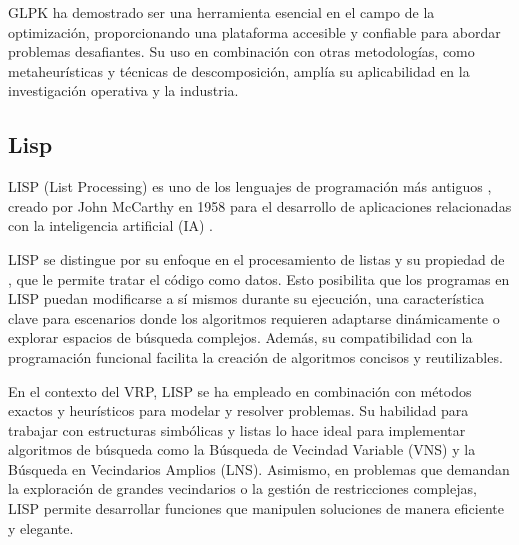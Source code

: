 \documentclass[12pt]{article}
\begin{document}
GLPK ha demostrado ser una herramienta esencial en el campo de la optimización, proporcionando una plataforma accesible y confiable para abordar problemas desafiantes. Su uso en combinación con otras metodologías, como metaheurísticas y técnicas de descomposición, amplía su aplicabilidad en la investigación operativa y la industria.


\subsection{Lisp}
LISP (List Processing) es uno de los lenguajes de programación más antiguos \agregaesto{[REF]}, creado por John McCarthy en 1958 para el desarrollo de aplicaciones relacionadas con la inteligencia artificial (IA) \agregaesto{[REF]}. 

LISP se distingue por su enfoque en el procesamiento de listas y su propiedad de , que le permite tratar el código como datos. Esto posibilita que los programas en LISP puedan modificarse a sí mismos durante su ejecución, una característica clave para escenarios donde los algoritmos requieren adaptarse dinámicamente o explorar espacios de búsqueda complejos. Además, su compatibilidad con la programación funcional facilita la creación de algoritmos concisos y reutilizables.


En el contexto del VRP, LISP se ha empleado en combinación con métodos exactos y heurísticos para modelar y resolver problemas. Su habilidad para trabajar con estructuras simbólicas y listas lo hace ideal para implementar algoritmos de búsqueda como la Búsqueda de Vecindad Variable (VNS) y la Búsqueda en Vecindarios Amplios (LNS). Asimismo, en problemas que demandan la exploración de grandes vecindarios o la gestión de restricciones complejas, LISP permite desarrollar funciones que manipulen soluciones de manera eficiente y elegante.
\end{document}
